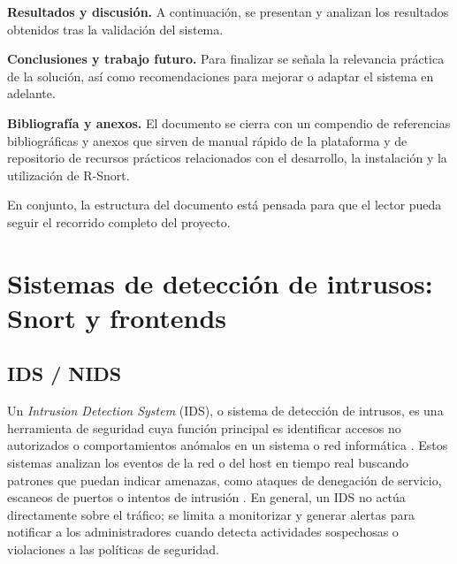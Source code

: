 \documentclass[11pt,a4paper,twoside]{report}
\begin{document}
\textbf{Resultados y discusión.} A continuación, se presentan y analizan los resultados obtenidos tras la validación del sistema.\newline

\textbf{Conclusiones y trabajo futuro.} Para finalizar se señala la relevancia práctica de la solución, así como recomendaciones para mejorar o adaptar el sistema en adelante.\newline

\textbf{Bibliografía y anexos.} El documento se cierra con un compendio de referencias bibliográficas y anexos que sirven de manual rápido de la plataforma y de repositorio de recursos prácticos relacionados con el desarrollo, la instalación y la utilización de R-Snort.\newline

En conjunto, la estructura del documento está pensada para que el lector pueda seguir el recorrido completo del proyecto.


\setcounter{secnumdepth}{2} 

\clearpage
\null
\thispagestyle{empty}
\newpage
\chapter{Sistemas de detección de intrusos: Snort y frontends}

\section{IDS / NIDS}

Un \textit{Intrusion Detection System} (IDS), o sistema de detección de intrusos, es una herramienta de seguridad cuya función principal es identificar accesos no autorizados o comportamientos anómalos en un sistema o red informática \cite{wikiNIDS}. Estos sistemas analizan los eventos de la red o del host en tiempo real buscando patrones que puedan indicar amenazas, como ataques de denegación de servicio, escaneos de puertos o intentos de intrusión \cite{NISTSP80094}. En general, un IDS no actúa directamente sobre el tráfico; se limita a monitorizar y generar alertas para notificar a los administradores cuando detecta actividades sospechosas o violaciones a las políticas de seguridad.\newline
\end{document}
